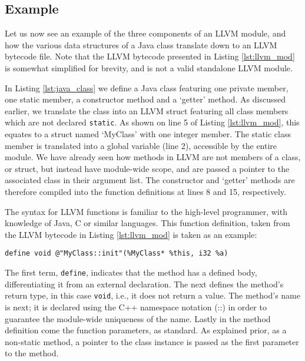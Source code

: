 \subsection*{Example}

Let us now see an example of the three components of an LLVM module, and how the various data structures of a Java class translate down to an LLVM bytecode file. Note that the LLVM bytecode presented in Listing \ref{lst:llvm_mod} is somewhat simplified for brevity, and is not a valid standalone LLVM module.

In Listing \ref{lst:java_class} we define a Java class featuring one private member, one static member, a constructor method and a `getter' method. As discussed earlier, we translate the class into an LLVM struct featuring all class members which are not declared \verb|static|. As shown on line 5 of Listing \ref{lst:llvm_mod}, this equates to a struct named `MyClass' with one integer member. The static class member is translated into a global variable (line 2), accessible by the entire module. We have already seen how methods in LLVM are not members of a class, or struct, but instead have module-wide scope, and are passed a pointer to the associated class in their argument list. The constructor and `getter' methods are therefore compiled into the function definitions at lines 8 and 15, respectively.

The syntax for LLVM functions is familiar to the high-level programmer, with knowledge of Java, C or similar languages. This function definition, taken from the LLVM bytecode in Listing \ref{lst:llvm_mod} is taken as an example:

\begin{lstlisting}[frame=single]
define void @"MyClass::init"(%MyClass* %this, i32 %a)
\end{lstlisting}

The first term, \verb|define|, indicates that the method has a defined body, differentiating it from an external declaration. The next defines the method's return type, in this case \verb|void|, i.e., it does not return a value. The method's name is next; it is declared using the C++ namespace notation (::) in order to guarantee the module-wide uniqueness of the name. Lastly in the method definition come the function parameters, as standard. As explained prior, as a non-static method, a pointer to the class instance is passed as the first parameter to the method.

\lstset{
	language=Java,
	basicstyle=\small,
	stringstyle=\ttfamily
}

